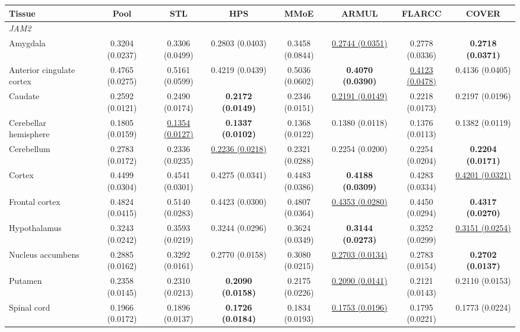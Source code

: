 \begin{table}
\centering
\scriptsize
\setlength{\tabcolsep}{2.7pt}
\begin{tabular}{lccccccc}
\toprule
Tissue & Pool & STL & HPS & MMoE & ARMUL & FLARCC & COVER \\
\midrule
\multicolumn{8}{l}{\textit{JAM2}} \\
Amygdala & 0.3204 (0.0237) & 0.3306 (0.0499) & 0.2803 (0.0403) & 0.3458 (0.0844) & \underline{0.2744 (0.0351)} & 0.2778 (0.0336) & \textbf{0.2718 (0.0371)} \\
Anterior cingulate cortex & 0.4765 (0.0275) & 0.5161 (0.0599) & 0.4219 (0.0439) & 0.5036 (0.0602) & \textbf{0.4070 (0.0390)} & \underline{0.4123 (0.0478)} & 0.4136 (0.0405) \\
Caudate & 0.2592 (0.0121) & 0.2490 (0.0174) & \textbf{0.2172 (0.0149)} & 0.2346 (0.0151) & \underline{0.2191 (0.0149)} & 0.2218 (0.0173) & 0.2197 (0.0196) \\
Cerebellar hemisphere & 0.1805 (0.0159) & \underline{0.1354 (0.0127)} & \textbf{0.1337 (0.0102)} & 0.1368 (0.0122) & 0.1380 (0.0118) & 0.1376 (0.0113) & 0.1382 (0.0119) \\
Cerebellum & 0.2783 (0.0172) & 0.2336 (0.0235) & \underline{0.2236 (0.0218)} & 0.2321 (0.0288) & 0.2254 (0.0200) & 0.2254 (0.0204) & \textbf{0.2204 (0.0171)} \\
Cortex & 0.4499 (0.0304) & 0.4541 (0.0301) & 0.4275 (0.0341) & 0.4483 (0.0386) & \textbf{0.4188 (0.0309)} & 0.4283 (0.0334) & \underline{0.4201 (0.0321)} \\
Frontal cortex & 0.4824 (0.0415) & 0.5140 (0.0283) & 0.4423 (0.0300) & 0.4807 (0.0364) & \underline{0.4353 (0.0280)} & 0.4450 (0.0294) & \textbf{0.4317 (0.0270)} \\
Hypothalamus & 0.3243 (0.0242) & 0.3593 (0.0219) & 0.3244 (0.0296) & 0.3624 (0.0349) & \textbf{0.3144 (0.0273)} & 0.3252 (0.0299) & \underline{0.3151 (0.0254)} \\
Nucleus accumbens & 0.2885 (0.0162) & 0.3292 (0.0161) & 0.2770 (0.0158) & 0.3080 (0.0215) & \underline{0.2703 (0.0134)} & 0.2783 (0.0154) & \textbf{0.2702 (0.0137)} \\
Putamen & 0.2358 (0.0145) & 0.2310 (0.0213) & \textbf{0.2090 (0.0158)} & 0.2175 (0.0226) & \underline{0.2090 (0.0141)} & 0.2121 (0.0143) & 0.2110 (0.0153) \\
Spinal cord & 0.1966 (0.0172) & 0.1896 (0.0137) & \textbf{0.1726 (0.0184)} & 0.1834 (0.0193) & \underline{0.1753 (0.0196)} & 0.1795 (0.0221) & 0.1773 (0.0224) \\

\end{tabular}
\end{table}
